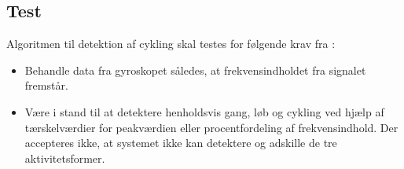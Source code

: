 \subsection{Test}
Algoritmen til detektion af cykling skal testes for følgende krav fra :
\begin{itemize}
	\item Behandle data fra gyroskopet således, at frekvensindholdet fra signalet fremstår.
	\item Være i stand til at detektere henholdsvis gang, løb og cykling ved hjælp af tærskelværdier for peakværdien eller procentfordeling af frekvensindhold. Der accepteres ikke, at systemet ikke kan detektere og adskille de tre aktivitetsformer.
\end{itemize}


